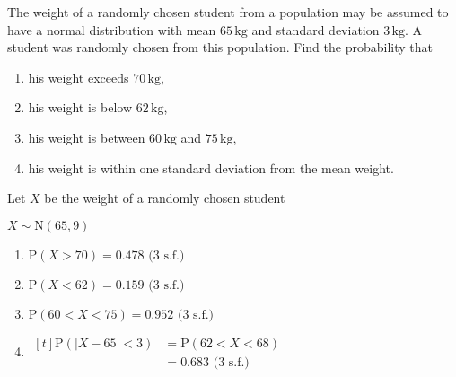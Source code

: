 \documentclass[11pt,a4paper]{book}
\begin{document}
\begin{example}

The weight of a randomly chosen student from a population may be assumed
to have a normal distribution with mean $65\,\text{kg}$ and standard
deviation $3\,\text{kg}$. A student was randomly chosen from this
population. Find the probability that

\begin{enumerate}[label=(\alph*)]

\item  his weight exceeds $\text{70}\,\text{kg}$,

\item  his weight is below $\text{62}\,\text{kg}$,

\item  his weight is between $60\,\text{kg}$ and $75\,\text{kg}$,

\item  his weight is within one standard deviation from the mean
weight.

\end{enumerate}

\Solution

Let $X$ be the weight of a randomly chosen student

$X\sim\text{N}\left(65,9\right)$

\begin{enumerate}[label=(\alph*)]

\item  $\text{P}\left(X>70\right)=0.478\text{ (3 s.f.)}$

\item  $\text{P}\left(X<62\right)=0.159\text{ (3 s.f.)}$

\item  $\text{P}\left(60<X<75\right)=0.952\text{ (3 s.f.)}$

\item
$
\begin{aligned}[t]
\text{P}\left(\left|X-65\right|<3\right) & =\text{P}\left(62<X<68\right)\\
 & =0.683\text{ (3 s.f.)}
\end{aligned}
$

\end{enumerate}

\end{example}

\newpage
\end{document}
